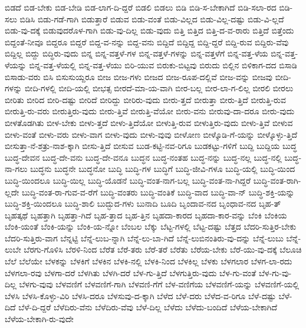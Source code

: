 {ಬಿಡದೆ
ಬಿಡ-ಬೇಕು
ಬಿಡ-ಬೇಡಿ
ಬಿಡ-ಲಾಗ-ದಿ-ದ್ದರೆ
ಬಿಡಲಿ
ಬಿಡಲು
ಬಿಡಿ
ಬಿಡಿ-ಸ-ಬೇಕಾಗಿದೆ
ಬಿಡಿ-ಸಲಾ-ರದ
ಬಿಡಿ-ಸಲು
ಬಿಡಿಸಿ
ಬಿಡು-ಗಡೆ-ಗಾಗಿ
ಬಿಡುತ್ತಾರೆ
ಬಿಡುವ
ಬಿಡು-ವಂತೆ
ಬಿಡು-ವಿಲ್ಲದ
ಬಿಡು-ವಿಲ್ಲ-ದಷ್ಟು
ಬಿಡು-ವಿ-ಲ್ಲದೆ
ಬಿಡು-ವು-ದಕ್ಕೆ
ಬಿಡುವುದರೊಳ-ಗಾಗಿ
ಬಿಡು-ವು-ದಿಲ್ಲ
ಬಿಡು-ವುದು
ಬಿತ್ತಿ
ಬಿತ್ತಿದ
ಬಿತ್ತಿ-ದ-ವ-ರಾರು
ಬಿತ್ತಿದೆ
ಬಿತ್ತೆಂದು
ಬಿದ್ದಂತೆ-ನೀವೂ
ಬಿದ್ದರೂ
ಬಿದ್ದರೆ
ಬಿದ್ದ-ವ-ನನ್ನು
ಬಿದ್ದ-ವನು
ಬಿದ್ದಿದೆ
ಬಿದ್ದಿದ್ದ
ಬಿದ್ದಿ-ದ್ದರೆ
ಬಿದ್ದಿ-ರುವ
ಬಿದ್ದಿರು-ವೆವು
ಬಿದ್ದಿಲ್ಲ
ಬಿದ್ದು
ಬಿದ್ಧಿರು-ವುದು
ಬಿನ್ನ
ಬಿನ್ನ-ವತ್ತಳೆ-ಗಳ
ಬಿನ್ನ-ವತ್ತಳೆ-ಗಳನ್ನು
ಬಿನ್ನ-ವತ್ತಳೆಗೆ
ಬಿನ್ನ-ವತ್ತ-ಳೆಯ
ಬಿನ್ನ-ವತ್ತ-ಳೆಯನ್ನು
ಬಿನ್ನ-ವತ್ತ-ಳೆಯಲ್ಲಿ
ಬಿನ್ನ-ವತ್ತ-ಳೆಯು
ಬಿರಿ-ಯುವ
ಬಿರುಕು-ಬಿಟ್ಟವು
ಬಿರುದು
ಬಿಲ್ಲಿನ
ಬಿಳಿಕಾಗ-ದದ
ಬಿಸಾಡಿ
ಬಿಸಾಡು-ವರು
ಬಿಸಿ
ಬಿಸುಸುಯ್ದರೂ
ಬೀಜ
ಬೀಜ-ಗಳು
ಬೀಜದ
ಬೀಜ-ರೂಪ-ದಲ್ಲಿವೆ
ಬೀಜ-ವನ್ನು
ಬೀಜವು
ಬೀದಿ-ಗಳನ್ನು
ಬೀದಿ-ಗಳಲ್ಲಿ
ಬೀದಿ-ಯಲ್ಲಿ
ಬೀಭತ್ಸ
ಬೀರದೆ-ಮಾ-ಯ-ವಾಗಿ
ಬೀರ-ಬಲ್ಲ
ಬೀರ-ಲಾ-ಗ-ಲಿಲ್ಲ
ಬೀರಲಿ
ಬೀರಲು
ಬೀರಿತು
ಬೀರಿದ
ಬೀರಿ-ದಷ್ಟು
ಬೀರಿದೆ
ಬೀರಿದ್ದು
ಬೀರಿರು-ವುದು
ಬೀರು-ತ್ತದೆ
ಬೀರುತ್ತಾ
ಬೀರು-ತ್ತಿದೆ
ಬೀರುತ್ತಿ-ರುವ
ಬೀರುತ್ತಿ-ರು-ವರು
ಬೀರುತ್ತಿರು-ವುದು
ಬೀರು-ತ್ತಿವೆ
ಬೀರುತ್ತಿ-ವೆಯೋ
ಬೀರು-ವನು
ಬೀರುವು-ದಾ-ದರೂ
ಬೀರು-ವುದು
ಬೀಳತೊಡಗಿತು
ಬೀಳ-ಬೇಕು
ಬೀಳು-ತ್ತದೆ
ಬೀಳು-ತ್ತಿದೆಯೋ
ಬೀಳುತ್ತಿ-ರುವ
ಬೀಳುತ್ತಿರು-ವುದು
ಬೀಳು-ತ್ತಿವೆ
ಬೀಳುವ
ಬೀಳು-ವಂತೆ
ಬೀಳು-ವರು
ಬೀಳು-ವಾಗ
ಬೀಳು-ವುದು
ಬೀಳು-ವುವು
ಬೀಳೋಣ
ಬೀಳ್ಕೊಡಿ-ಗೆ-ಯನ್ನು
ಬೀಳ್ಕೊಳ್ಳು-ತ್ತಿದೆ
ಬೀಸುತ್ತಾ-ನೆ-ಶತ್ರು-ನಾಶ-ಕ್ಕಾಗಿ
ಬೀಸು-ತ್ತಿದೆ
ಬೀಸುವ
ಬುಡ-ಕಟ್ಟಿ-ನವ-ರಿಗೂ
ಬುಡಕಟ್ಟು-ಗಳಿಗೆ
ಬುದ್ದಿ
ಬುದ್ದಿಯ
ಬುದ್ಧ
ಬುದ್ಧ-ದೇವನ
ಬುದ್ಧ-ದೇ-ವನು
ಬುದ್ಧ-ದೇ-ವನೂ
ಬುದ್ಧನ
ಬುದ್ಧ-ನಂತಹ
ಬುದ್ಧ-ನನ್ನು
ಬುದ್ಧ-ನಲ್ಲ
ಬುದ್ಧ-ನಲ್ಲಿ
ಬುದ್ಧ-ನಾ-ಗಲು
ಬುದ್ಧನು
ಬುದ್ಧನೇ
ಬುದ್ಧನೋ
ಬುದ್ಧಿ
ಬುದ್ಧಿ-ಗಳ
ಬುದ್ಧಿಗೆ
ಬುದ್ಧಿ-ಜೀವಿ-ಗಳೂ
ಬುದ್ಧಿ-ಯಲ್ಲಿ
ಬುದ್ಧಿ-ಯಿಂದ
ಬುದ್ಧಿ-ಯಿಂದಲೂ
ಬುದ್ಧಿ-ಯಿಲ್ಲ
ಬುದ್ಧಿ-ಯೊಡನೆ
ಬುದ್ಧಿ-ವಂತ-ನಾಗ-ಬಲ್ಲ
ಬುದ್ಧಿ-ವಂತ-ನಾ-ಗಿದ್ದರೆ
ಬುದ್ಧಿ-ವಂತ-ರಾಗಿ-ಲ್ಲದೇ
ಬುದ್ಧಿ-ವಂತ-ರಾ-ಗುವ-ವ-ರೆಗೆ
ಬುದ್ಧಿ-ವಂತರು
ಬುದ್ಧಿ-ವಂತಿಕೆ
ಬುದ್ಧಿ-ವಾದ
ಬುದ್ಧಿ-ವಾ-ನ್
ಬುದ್ಧಿ-ಶಕ್ತಿ-ಯನ್ನು
ಬುದ್ಧಿ-ಶಕ್ತಿ-ಯಿಂದಲೂ
ಬುದ್ಧಿ-ಶಾಲಿ
ಬುದ್ಭುದ-ಗಳು
ಬುನಾದಿ
ಬೂದಿ
ಬೃಂದಾವ-ನದ
ಬೃಂಧಾವ-ನದ
ಬೃಹ-ತ್
ಬೃಹತ್ಕಥೆ
ಬೃಹತ್ತಾಗಿ
ಬೃಹತ್ತಾ-ಗಿದೆ
ಬೃಹ-ತ್ತಾದ
ಬೃಹ-ತ್ತಿನ
ಬೃಹದಾ-ಕಾರದ
ಬೃಹದಾ-ಕಾರ-ವನ್ನು
ಬೆಂಕಿ
ಬೆಂಕಿಯ
ಬೆಂಕಿ-ಯಂತೆ
ಬೆಂಕಿ-ಯನ್ನು
ಬೆಂಕಿ-ಯ-ನ್ನೋ
ಬೆಂಬಲ
ಬೆಕ್ಕು
ಬೆಟ್ಟ-ಗಳಲ್ಲಿ
ಬೆಟ್ಟ-ದಷ್ಟು
ಬೆತ್ತದ
ಬೆದರಿ-ಸುತ್ತಿರ-ಬೇಕು
ಬೆದರಿ-ಸುತ್ತಿರು-ವಾಗ
ಬೆನ್ನಟ್ಟಿ
ಬೆನ್ನೆ-ಲುಬ-ನ್ನಾಗಿ
ಬೆನ್ನೆ-ಲು-ಬಾ-ಗಿದೆ
ಬೆನ್ನೆ-ಲುಬಿನಂತಿರು-ವು-ದನ್ನು
ಬೆನ್ನೆ-ಲುಬು
ಬೆನ್ನೆ-ಲುಬೇ
ಬೆರಗು-ಗೊಳಿಸಿ
ಬೆರಳಿ-ನಿಂದ
ಬೆರೆತ
ಬೆರೆ-ತರು
ಬೆರೆ-ತರೆ
ಬೆರೆತು
ಬೆರೆಯ-ಬೇಕು
ಬೆರೆ-ಯು-ವು-ದಕ್ಕೆ
ಬೆಲೂಚಿ
ಬೆಲೆ
ಬೆಲೆಯೇ
ಬೆಳಕನ್ನು
ಬೆಳಕಿಗೆ
ಬೆಳಕಿನ
ಬೆಳಕಿ-ನಲ್ಲಿ
ಬೆಳಕಿ-ನಿಂದ
ಬೆಳಕಿಲ್ಲ
ಬೆಳಕು
ಬೆಳಗಲಾರ
ಬೆಳಗ-ಲಾ-ರದು
ಬೆಳಗಲಾ-ರವು
ಬೆಳಗಾ-ದರೆ
ಬೆಳಗಿತು
ಬೆಳಗಿ-ದರೆ
ಬೆಳ-ಗು-ತ್ತಿದೆ
ಬೆಳಗುತ್ತಿರು-ವುದು
ಬೆಳ-ಗು-ವಂತೆ
ಬೆಳ-ಗು-ವು-ದಿಲ್ಲ
ಬೆಳಗು-ವುವು
ಬೆಳವಣಿಗೆ
ಬೆಳವಣಿಗೆ-ಗಾಗಿ
ಬೆಳವಣಿ-ಗೆಗೆ
ಬೆಳ-ವಣಿಗೆಯ
ಬೆಳವಣಿಗೆ-ಯನ್ನು
ಬೆಳವಣಿಗೆ-ಯಲ್ಲಿ
ಬೆಳಸಿ
ಬೆಳಸಿ-ಕೊಳ್ಳು-ವಿರಿ
ಬೆಳಸಿ-ದರೂ
ಬೆಳಸುವು-ದ-ಕ್ಕಾಗಿ
ಬೆಳೆದ
ಬೆಳೆ-ದರು
ಬೆಳೆದ-ವ-ರಿಗೂ
ಬೆಳೆ-ದಷ್ಟು
ಬೆಳೆ-ದಿದೆ
ಬೆಳೆ-ದಿ-ದ್ದರೆ
ಬೆಳೆದಿರು-ವೆನು
ಬೆಳೆದಿರು-ವೆವು
ಬೆಳೆ-ದಿಲ್ಲ
ಬೆಳೆದು
ಬೆಳೆದು-ಬಂದಿದೆ
ಬೆಳೆಯ-ಬೇಕಾಗಿದೆ
ಬೆಳೆಯ-ಬೇಕಾಗಿ-ರು-ವುದೇ
}

